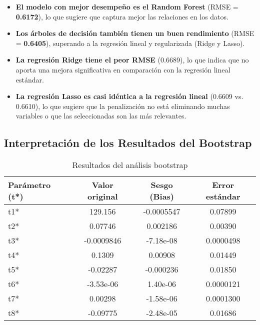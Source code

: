 \documentclass[12pt,a4paper,onecolumn]{article}
\begin{document}
\begin{itemize}
    \item \textbf{El modelo con mejor desempeño es el Random Forest} (RMSE = \textbf{0.6172}), lo que sugiere que captura mejor las relaciones en los datos.

    \item \textbf{Los árboles de decisión también tienen un buen rendimiento} (RMSE = \textbf{0.6405}), superando a la regresión lineal y regularizada (Ridge y Lasso).

    \item \textbf{La regresión Ridge tiene el peor RMSE} (0.6689), lo que indica que no aporta una mejora significativa en comparación con la regresión lineal estándar.

    \item \textbf{La regresión Lasso es casi idéntica a la regresión lineal} (0.6609 vs. 0.6610), lo que sugiere que la penalización no está eliminando muchas variables o que las seleccionadas son las más relevantes.
\end{itemize}

\subsection{Interpretación de los Resultados del Bootstrap}

\begin{table}[htbp]
    \centering
    \caption{Resultados del análisis bootstrap}
    \label{tab:bootstrap_results}
    \begin{tabular}{lccc}
    \toprule
    \textbf{Parámetro (t*)} & \textbf{Valor original} & \textbf{Sesgo (Bias)} & \textbf{Error estándar} \\
    \midrule
    t1* & 129.156 & -0.0005547 & 0.07899 \\
    t2* & 0.07746 & 0.002186 & 0.00390 \\
    t3* & -0.0009846 & -7.18e-08 & 0.0000498 \\
    t4* & 0.1309 & 0.00908 & 0.01449 \\
    t5* & -0.02287 & -0.000236 & 0.01850 \\
    t6* & -3.53e-06 & 1.40e-06 & 0.0000121 \\
    t7* & 0.00298 & -1.58e-06 & 0.0001300 \\
    t8* & -0.09775 & -2.48e-05 & 0.01686 \\
    \bottomrule
    \end{tabular}
\end{table}
\end{document}
